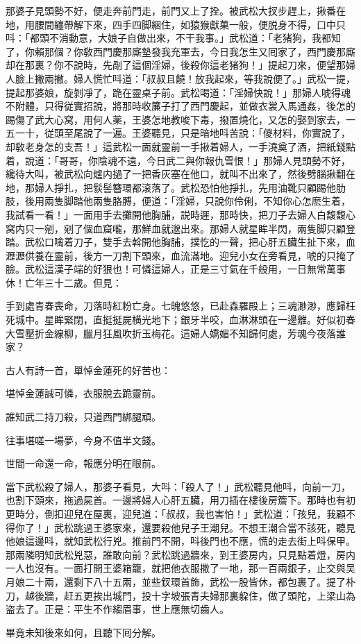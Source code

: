 那婆子見頭勢不好，便走奔前門走，前門又上了拴。被武松大扠步趕上，揪番在地，用腰間纏帶解下來，四手四脚綑住，如猿猴獻菓一般，便脱身不得，口中只呌：「都頭不消動意，大娘子自做出來，不干我事。」武松道：「老猪狗，我都知了，你賴那個？你敎西門慶那廝墊發我充軍去，今日我怎生又囘家了，西門慶那廝却在那裏？你不說時，先剮了這個淫婦，後殺你這老猪狗！」提起刀來，便望那婦人臉上撇兩撇。婦人慌忙呌道：「叔叔且饒！放我起來，等我說便了。」武松一提，提起那婆娘，旋剝凈了，跪在靈桌子前。武松喝道：「淫婦快說！」那婦人唬得魂不附體，只得従實招說，將那時收簾子打了西門慶起，並做衣裳入馬通姦，後怎的踢傷了武大心窝，用何人薬，王婆怎地教唆下毒，撥置燒化，又怎的娶到家去，一五一十，従頭至尾說了一遍。王婆聽見，只是暗地呌苦說：「儍材料，你實說了，却敎老身怎的支吾！」這武松一面就靈前一手揪着婦人，一手澆奠了酒，把紙錢點着，說道：「哥哥，你陰魂不遠，今日武二與你報仇雪恨！」那婦人見頭勢不好，纔待大叫，被武松向爐内撾了一把香灰塞在他口，就叫不出來了，然後劈腦揪翻在地，那婦人掙扎，把䯼髻簪環都滚落了。武松恐怕他掙扎，先用油靴只顧踢他肋肢，後用兩隻脚踏他兩隻胳膊，便道：「淫婦，只說你伶俐，不知你心怎麽生着，我試看一看！」一面用手去攤開他胸脯，説時遲，那時快，把刀子去婦人白馥馥心窝内只一剜，剜了個血窟嚨，那鮮血就邈出來。那婦人就星眸半閃，兩隻脚只顧登踏。武松口噙着刀子，雙手去斡開他胸脯，撲忔的一聲，把心肝五臟生扯下來，血瀝瀝供養在靈前，後方一刀割下頭來，血流滿地。迎兒小女在旁看見，唬的只掩了臉。武松這漢子端的好狠也！可憐這婦人，正是三寸氣在千般用，一日無常萬事休！亡年三十二歲。但見：

\begin{myquote}
手到處青春喪命，刀落時紅粉亡身。七魄悠悠，已赴森羅殿上；三魂渺渺，應歸枉死城中。星眸緊閉，直挺挺屍横光地下；銀牙半咬，血淋淋頭在一邊離。好似初春大雪壓折金線柳，臘月狂風吹折玉梅花。這婦人嬌媚不知歸何處，芳魂今夜落誰家？
\end{myquote}

古人有詩一首，單悼金蓮死的好苦也：

\begin{myquote}
堪悼金蓮誠可憐，衣服脫去跪靈前。

誰知武二持刀殺，只道西門綁腿頑。

往事堪嗟一場夢，今身不值半文錢。

世間一命還一命，報應分明在眼前。
\end{myquote}

當下武松殺了婦人，那婆子看見，大呌：「殺人了！」武松聽見他呌，向前一刀，也割下頭來，拖過屍首。一邊將婦人心肝五臟，用刀插在樓後房簷下。那時也有初更時分，倒扣迎兒在屋裏，迎兒道：「叔叔，我也害怕！」武松道：「孩兒，我顧不得你了！」武松跳過王婆家來，還要殺他兒子王潮兒。不想王潮合當不該死，聽見他娘這邊呌，就知武松行兇。推前門不開，呌後門也不應，慌的走去街上呌保甲。那兩隣明知武松兇惡，誰敢向前？武松跳過牆來，到王婆房内，只見點着燈，房内一人也沒有。一面打開王婆箱籠，就把他衣服撒了一地，那一百兩銀子，止交與吴月娘二十兩，還剩下八十五兩，並些釵環首飾，武松一股皆休，都包裹了。提了朴刀，越後牆，赶五更挨出城門，投十字坡張青夫婦那裏躱住，做了頭陀，上梁山為盗去了。正是：平生不作縐眉事，世上應無切齒人。

畢竟未知後來如何，且聽下囘分解。


